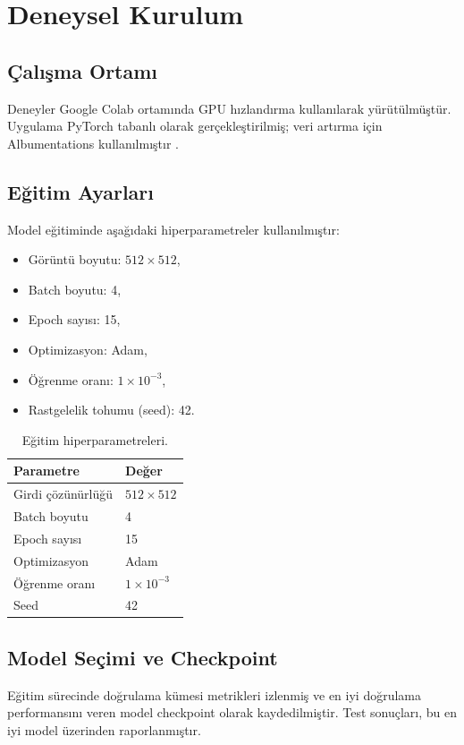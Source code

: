 \section{Deneysel Kurulum}
\subsection{Çalışma Ortamı}
Deneyler Google Colab ortamında GPU hızlandırma kullanılarak yürütülmüştür. Uygulama PyTorch tabanlı olarak gerçekleştirilmiş; veri artırma için Albumentations kullanılmıştır \cite{buslaev2020albumentations}.

\subsection{Eğitim Ayarları}
Model eğitiminde aşağıdaki hiperparametreler kullanılmıştır:
\begin{itemize}
    \item Görüntü boyutu: $512\times512$,
    \item Batch boyutu: 4,
    \item Epoch sayısı: 15,
    \item Optimizasyon: Adam,
    \item Öğrenme oranı: $1\times10^{-3}$,
    \item Rastgelelik tohumu (seed): 42.
\end{itemize}

\begin{table}[H]
\centering
\caption{Eğitim hiperparametreleri.}
\label{tab:hyperparams}
\begin{tabular}{ll}
\toprule
\textbf{Parametre} & \textbf{Değer} \\
\midrule
Girdi çözünürlüğü & $512\times512$ \\
Batch boyutu & 4 \\
Epoch sayısı & 15 \\
Optimizasyon & Adam \\
Öğrenme oranı & $1\times10^{-3}$ \\
Seed & 42 \\
\bottomrule
\end{tabular}
\end{table}

\subsection{Model Seçimi ve Checkpoint}
Eğitim sürecinde doğrulama kümesi metrikleri izlenmiş ve en iyi doğrulama performansını veren model checkpoint olarak kaydedilmiştir. Test sonuçları, bu en iyi model üzerinden raporlanmıştır.
